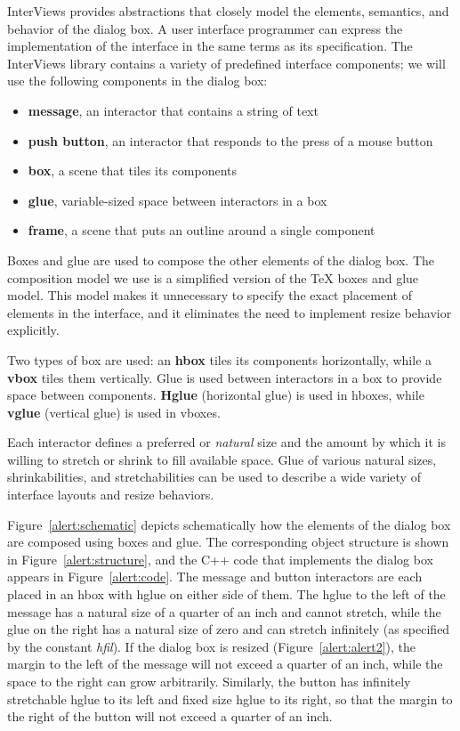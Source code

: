 InterViews provides abstractions that closely model the elements,
semantics, and behavior of the dialog box.  A user interface
programmer can express the implementation of the interface in the same
terms as its specification.  The InterViews library contains a variety
of predefined interface components; we will use the following
components in the dialog box:

\begin{itemize}

\item {\bf message}, an interactor that contains a string of text
\item {\bf push button}, an interactor that responds
to the press of a mouse button
\item {\bf box}, a scene that tiles its components
\item {\bf glue}, variable-sized space between interactors in a box
\item {\bf frame}, a scene that puts an outline around a single component

\end{itemize}

Boxes and glue are used to compose the other elements of the dialog box.  The
composition
model we use is a simplified version of the \TeX \cite{tex} boxes
and glue model.  This model makes it unnecessary to specify the
exact placement of elements in the interface, and it eliminates the need to
implement resize behavior explicitly.

Two types of box are used:
an {\bf hbox} tiles its components horizontally, while a {\bf vbox}
tiles them vertically.  Glue is used between interactors in a box to provide
space between components.  {\bf Hglue} (horizontal glue)
is used in hboxes, while {\bf vglue} (vertical glue) is
used in vboxes.    

Each interactor defines a preferred or {\em natural} size and the amount
by which it is willing to stretch or shrink to fill available space.
Glue of various natural sizes, shrinkabilities, and
stretchabilities can be used to describe a wide variety of interface
layouts and resize behaviors.

Figure~\ref{alert:schematic} depicts schematically how the elements of
the dialog box are composed using boxes and glue.  
The corresponding object structure is shown in
Figure~\ref{alert:structure}, and the C++ code that implements 
the dialog box appears in Figure~\ref{alert:code}.
The message and button interactors are each placed in an hbox with hglue
on either side of them.  The hglue to the left of the message has a
natural size of a quarter of an inch and cannot stretch, while the
glue on the right has a natural size of zero and can stretch
infinitely (as specified by the constant {\em hfil\/}).
If the dialog box is resized
(Figure~\ref{alert:alert2}), the margin to the left of the message will not
exceed a quarter of an inch, while the space to the right can grow
arbitrarily.  Similarly, the button has infinitely stretchable hglue
to its left and fixed size hglue to its right, so that the margin to
the right of the button will not exceed a quarter of an inch.

